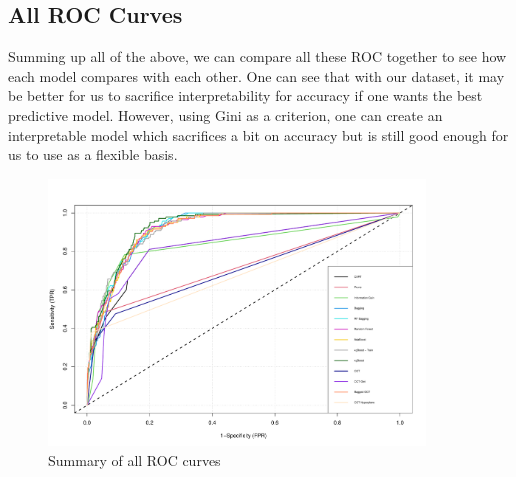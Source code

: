 \documentclass[11pt,a4paper]{report}
\begin{document}
\subsection{All ROC Curves}
Summing up all of the above, we can compare all these ROC together to see how each model compares with each other.
One can see that with our dataset, it may be better for us to sacrifice interpretability for accuracy if one wants the best predictive model.
However, using Gini as a criterion, one can create an interpretable model which sacrifices a bit on accuracy but is still good enough for us to use as a flexible basis. \begin{figure}[h]
    \centering
    \includegraphics[width = 10cm]{reportcharts/ROC.pdf}
    \caption{Summary of all ROC curves}
    \label{fig:allroccurves}
\end{figure}
\end{document}
